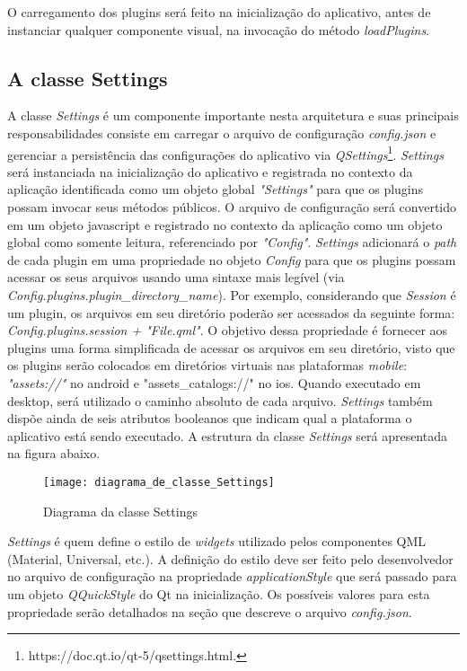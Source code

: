 O carregamento dos plugins será feito na inicialização do aplicativo, antes de instanciar qualquer componente visual, na invocação do método \textit{loadPlugins}.


\subsection{A classe Settings}\label{sec:solucao-desenvolvida}
A classe \textit{Settings} é um componente importante nesta arquitetura e suas principais responsabilidades consiste em carregar o arquivo de configuração \textit{config.json} e gerenciar a persistência das configurações do aplicativo via \textit{QSettings}\footnote{https://doc.qt.io/qt-5/qsettings.html.}. \textit{Settings} será instanciada na inicialização do aplicativo e registrada no contexto da aplicação identificada como um objeto global \textit{"Settings"} para que os plugins possam invocar seus métodos públicos. O arquivo de configuração será convertido em um objeto javascript e registrado no contexto da aplicação como um objeto global como somente leitura, referenciado por \textit{"Config"}. \textit{Settings} adicionará o \textit{path} de cada plugin em uma propriedade no objeto \textit{Config} para que os plugins possam acessar os seus arquivos usando uma sintaxe mais legível (via \textit{Config.plugins.plugin\_directory\_name}). Por exemplo, considerando que \textit{Session} é um plugin, os arquivos em seu diretório poderão ser acessados da seguinte forma: \textit{Config.plugins.session + "File.qml"}. O objetivo dessa propriedade é fornecer aos plugins uma forma simplificada de acessar os arquivos em seu diretório, visto que os plugins serão colocados em diretórios virtuais nas plataformas \textit{mobile}: \textit{"assets://"} no android e "assets\_catalogs://" no ios. Quando executado em desktop, será utilizado o caminho absoluto de cada arquivo. \textit{Settings} também dispõe ainda de seis atributos booleanos que indicam qual a plataforma o aplicativo está sendo executado. A estrutura da classe \textit{Settings} será apresentada na figura abaixo.

\begin{figure}[H]
	\texttt{[image: diagrama\_de\_classe\_Settings]}
	\centering
	\caption{Diagrama da classe Settings}
\end{figure}

\textit{Settings} é quem define o estilo de \textit{widgets} utilizado pelos componentes QML (Material, Universal, etc.). A definição do estilo deve ser feito pelo desenvolvedor no arquivo de configuração na propriedade \textit{applicationStyle} que será passado para um objeto \textit{QQuickStyle} do Qt na inicialização. Os possíveis valores para esta propriedade serão detalhados na seção que descreve o arquivo \textit{config.json}.


